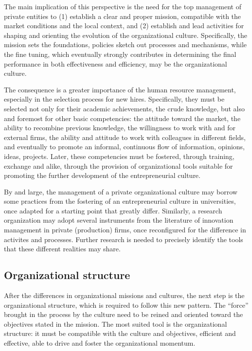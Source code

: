The main implication of this perspective is the need for the top management of private entities to (1) establish a clear and proper mission, compatible with the market conditions and the local context, and (2) establish and lead activities for shaping and orienting the evolution of the organizational culture. Specifically, the mission sets the foundations, policies sketch out processes and mechanisms, while the fine tuning, which eventually strongly contributes in determining the final performance in both effectiveness and efficiency, may be the organizational culture.

The consequence is a greater importance of the human resource management, especially in the selection process for new hires. Specifically, they must be selected not only for their academic achievements, the crude knowledge, but also and foremost for other basic competencies: the attitude toward the market, the ability to recombine previous knowledge, the willingness to work with and for external firms, the ability and attitude to work with colleagues in different fields, and eventually to promote an informal, continuous flow of information, opinions, ideas, projects. Later, these competencies must be fostered, through training, exchange and alike, through the provision of organizational tools suitable for promoting the further development of the entrepreneurial culture. 

By and large, the management of a private organizational culture may borrow some practices from the fostering of an entrepreneurial culture in universities, once adapted for a starting point that greatly differ. Similarly, a research organization may adopt several instruments from the literature of innovation management in private (production) firms, once reconfigured for the difference in activites and processes. Further research is needed to precisely identify the tools that these different realities may share.

\subsection{Organizational structure}

After the differences in organizational missions and cultures, the next step is the organizational structure, which is required to follow this new pattern. The \enquote{force} brought in the process by the culture need to be reined and oriented toward the objectives stated in the mission. The most suited tool is the organizational structure: it must be compatible with the culture and objectives, efficient and effective, able to drive and foster the organizational momentum. 

